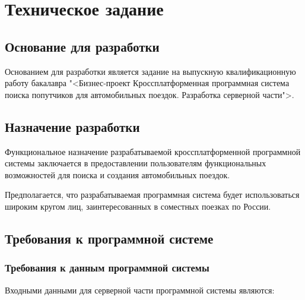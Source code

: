 \section{Техническое задание}
\subsection{Основание для разработки}

Основанием для разработки является задание на выпускную квалификационную работу бакалавра "<Бизнес-проект \textquotedbl Кроссплатформенная программная система поиска попутчиков для автомобильных поездок\textquotedbl. Разработка серверной части">.

\subsection{Назначение разработки}

Функциональное назначение разрабатываемой кроссплатформенной программной системы заключается в предоставлении пользователям функциональных возможностей для поиска и создания автомобильных поездок.

Предполагается, что разрабатываемая программная система будет использоваться широким кругом лиц, заинтересованных в соместных поезках по России.

\subsection{Требования к программной системе}
\subsubsection{Требования к данным программной системы}

Входными данными для серверной части программной системы являются:

